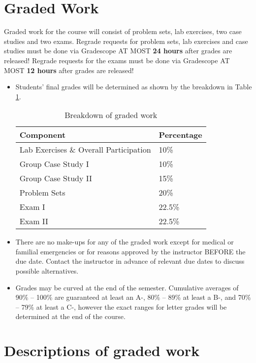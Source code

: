 \documentclass[11pt, a4paper]{article}
\begin{document}
\section{Graded Work} 
Graded work for the course will consist of problem sets, lab exercises, two case studies and two exams. Regrade requests for problem sets, lab exercises and case studies must be done via Gradescope AT MOST \textbf{24 hours} after grades are released! Regrade requests for the exams must be done via Gradescope AT MOST \textbf{12 hours} after grades are released!
\begin{itemize}[label= {\color{darkblue}{\ArrowBoldRightStrobe}}]
		\item Students' final grades will be determined as shown by the breakdown in Table \ref{gradedwork}.
	\begin{table}[h]
		\centering
		\caption{Breakdown of graded work} \label{gradedwork}
		\begin{tabular}{ll}
			Component & Percentage \\ 
			\hline
			Lab Exercises \& Overall Participation & 10\% \\
			Group Case Study I & 10\% \\
			Group Case Study II & 15\% \\
			Problem Sets & 20\% \\
			Exam I & 22.5\% \\ 
			Exam II & 22.5\% \\
			\hline 
		\end{tabular}
	\end{table}
	
	\item There are no make-ups for any of the graded work except for medical or familial emergencies or for reasons approved by the instructor BEFORE the due date. Contact the instructor in advance of relevant due dates to discuss possible alternatives. 
	
	\item Grades may be curved at the end of the semester. Cumulative averages of 90\% -- 100\% are guaranteed at least an A-, 80\% -- 89\% at least a B-, and 70\% -- 79\% at least a C-, however the exact ranges for letter grades will be determined at the end of the course.
\end{itemize}


\section{Descriptions of graded work}
\end{document}
